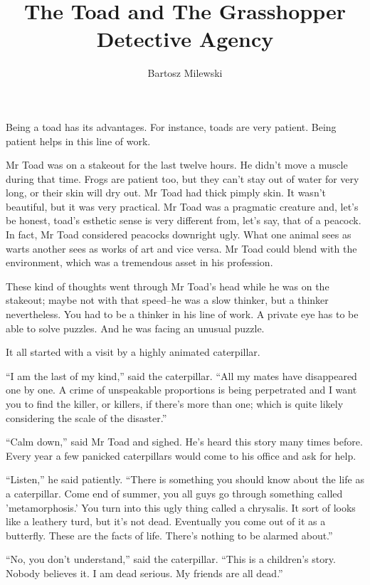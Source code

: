 \documentclass{memoir}
\author{Bartosz Milewski}
\title{The Toad and The Grasshopper Detective Agency}
\date{}
\begin{document}
\maketitle{}



Being a toad has its advantages. For instance, toads are very patient. Being patient helps in this line of work. 

Mr Toad was on a stakeout for the last twelve hours. He didn't move a muscle during that time. Frogs are patient too, but they can't stay out of water for very long, or their skin will dry out. Mr Toad had thick pimply skin. It wasn't beautiful, but it was very practical. Mr Toad was a pragmatic creature and, let's be honest, toad's esthetic sense is very different from, let's say, that of a peacock. In fact, Mr Toad considered peacocks downright ugly. What one animal sees as warts another sees as works of art and vice versa. Mr Toad could blend with the environment, which was a tremendous asset in his profession.

These kind of thoughts went through Mr Toad's head while he was on the stakeout; maybe not with that speed--he was a slow thinker, but a thinker nevertheless. You had to be a thinker in his line of work. A private eye has to be able to solve puzzles. And he was facing an unusual puzzle. 

It all started with a visit by a highly animated caterpillar. 

``I am the last of my kind,'' said the caterpillar. ``All my mates have disappeared one by one. A crime of unspeakable proportions is being perpetrated and I want you to find the killer, or killers, if there's more than one; which is quite likely considering the scale of the disaster.''

``Calm down,'' said Mr Toad and sighed. He's heard this story many times before. Every year a few panicked caterpillars would come to his office and ask for help.

``Listen,'' he said patiently. ``There is something you should know about the life as a caterpillar. Come end of summer, you all guys go through something called 'metamorphosis.' You turn into this ugly thing called a chrysalis. It sort of looks like a leathery turd, but it's not dead. Eventually you come out of it as a butterfly. These are the facts of life. There's nothing to be alarmed about.''

``No, you don't understand,'' said the caterpillar. ``This is a children's story. Nobody believes it. I am dead serious. My friends are all dead.''
\end{document}

